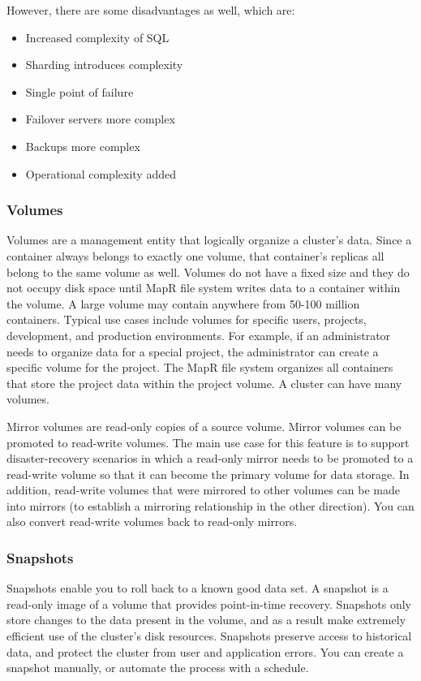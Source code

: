 \documentclass{article}
\begin{document}
However, there are some disadvantages as well, which are:
    \begin{itemize}
        \item Increased complexity of SQL
        \item Sharding introduces complexity
        \item Single point of failure
        \item Failover servers more complex
        \item Backups more complex
        \item Operational complexity added
    \end{itemize}

\subsubsection{Volumes}
Volumes are a management entity that logically organize a cluster’s data. Since a container always belongs to exactly one volume, that container’s replicas all belong to the same volume as well. Volumes do not have a fixed size and they do not occupy disk space until MapR file system writes data to a container within the volume. A large volume may contain anywhere from 50-100 million containers. Typical use cases include volumes for specific users, projects, development, and production environments. For example, if an administrator needs to organize data for a special project, the administrator can create a specific volume for the project. The MapR file system organizes all containers that store the project data within the project volume. A cluster can have many volumes.

Mirror volumes are read-only copies of a source volume. Mirror volumes can be promoted to read-write volumes. The main use case for this feature is to support disaster-recovery scenarios in which a read-only mirror needs to be promoted to a read-write volume so that it can become the primary volume for data storage. In addition, read-write volumes that were mirrored to other volumes can be made into mirrors (to establish a mirroring relationship in the other direction). You can also convert read-write volumes back to read-only mirrors.

\subsubsection{Snapshots}
Snapshots enable you to roll back to a known good data set. A snapshot is a read-only image of a volume that provides point-in-time recovery. Snapshots only store changes to the data present in the volume, and as a result make extremely efficient use of the cluster’s disk resources. Snapshots preserve access to historical data, and protect the cluster from user and application errors. You can create a snapshot manually, or automate the process with a schedule. 
\end{document}
